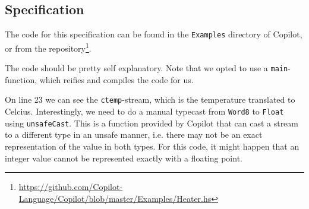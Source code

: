 \subsection{Specification}
The code for this specification can be found in the \texttt{Examples} directory
of Copilot, or from the
repository\footnote{\url{https://github.com/Copilot-Language/Copilot/blob/master/Examples/Heater.hs}}.


%
%
%
%
%
%
%
%
The code should be pretty self explanatory. Note that we opted to use a
\texttt{main}-function, which reifies and compiles the code for us.

On line 23 we can see the \texttt{ctemp}-stream, which is the temperature
translated to Celcius. Interestingly, we need to do a manual typecast from
\texttt{Word8} to \texttt{Float} using \texttt{unsafeCast}. This is a function
provided by Copilot that can cast a stream to a different type in an unsafe
manner, i.e. there may not be an exact representation of the value in both
types. For this code, it might happen that an integer value cannot be
represented exactly with a floating point.

